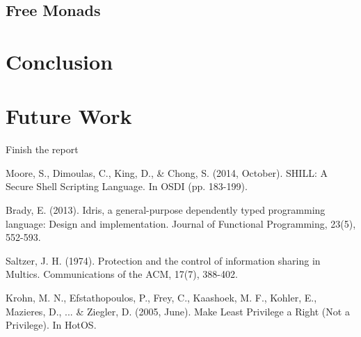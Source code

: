 \documentclass[11pt,a4paper]{article}
\begin{document}
\subsection{Free Monads}

\section{Conclusion}

\section{Future Work}
Finish the report

\begin{thebibliography}{99}
Moore, S., Dimoulas, C., King, D., \& Chong, S. (2014, October). SHILL: A Secure Shell Scripting Language. In OSDI (pp. 183-199).

Brady, E. (2013). Idris, a general-purpose dependently typed programming language: Design and implementation. Journal of Functional Programming, 23(5), 552-593.

Saltzer, J. H. (1974). Protection and the control of information sharing in Multics. Communications of the ACM, 17(7), 388-402.

Krohn, M. N., Efstathopoulos, P., Frey, C., Kaashoek, M. F., Kohler, E., Mazieres, D., ... \& Ziegler, D. (2005, June). Make Least Privilege a Right (Not a Privilege). In HotOS.

\end{thebibliography}
\end{document}
